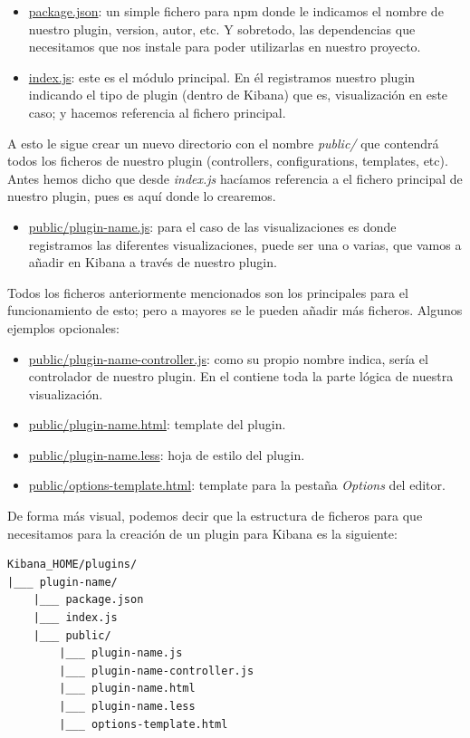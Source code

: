 \documentclass[a4paper, 12pt]{book}
\begin{document}
\begin{itemize}
    \item \underline{package.json}: un simple fichero para npm donde le indicamos el nombre de nuestro plugin, version, autor, etc. Y sobretodo, las dependencias que necesitamos que nos instale para poder utilizarlas en nuestro proyecto.
    \item \underline{index.js}: este es el módulo principal. En él registramos nuestro plugin indicando el tipo de plugin (dentro de Kibana) que es, visualización en este caso; y hacemos referencia al fichero principal.
\end{itemize}

A esto le sigue crear un nuevo directorio con el nombre \textit{public/} que contendrá todos los ficheros de nuestro plugin (controllers, configurations, templates, etc). Antes hemos dicho que desde \textit{index.js} hacíamos referencia a el fichero principal de nuestro plugin, pues es aquí donde lo crearemos.

\begin{itemize}
    \item \underline{public/plugin-name.js}: para el caso de las visualizaciones es donde registramos las diferentes visualizaciones, puede ser una o varias, que vamos a añadir en Kibana a través de nuestro plugin.
\end{itemize}

Todos los ficheros anteriormente mencionados son los principales para el funcionamiento de esto; pero a mayores se le pueden añadir más ficheros. Algunos ejemplos opcionales:

\begin{itemize}
    \item \underline{public/plugin-name-controller.js}: como su propio nombre indica, sería el controlador de nuestro plugin. En el contiene toda la parte lógica de nuestra visualización.
    \item \underline{public/plugin-name.html}: template del plugin.
    \item \underline{public/plugin-name.less}: hoja de estilo del plugin.
    \item \underline{public/options-template.html}: template para la pestaña \textit{Options} del editor.
\end{itemize}

De forma más visual, podemos decir que la estructura de ficheros para que necesitamos para la creación de un plugin para Kibana es la siguiente:

\begin{lstlisting}[frame=single]
Kibana_HOME/plugins/
|___ plugin-name/
    |___ package.json
    |___ index.js
    |___ public/
        |___ plugin-name.js
        |___ plugin-name-controller.js
        |___ plugin-name.html
        |___ plugin-name.less
        |___ options-template.html
\end{lstlisting}
\end{document}
